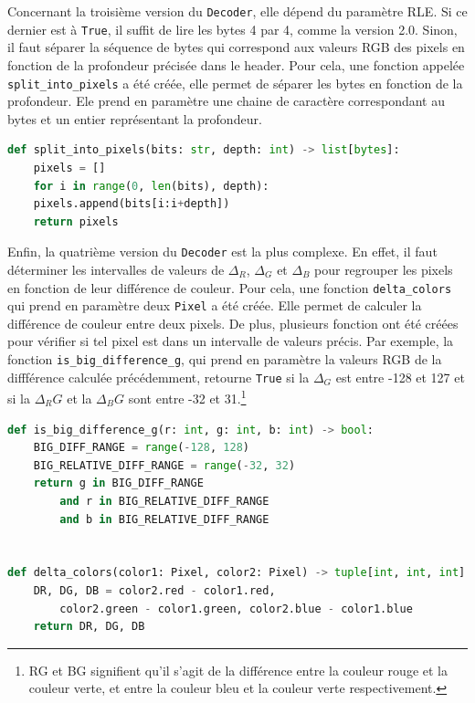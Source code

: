 \documentclass[utf8]{article}
\begin{document}
Concernant la troisième version du \texttt{Decoder}, elle dépend du paramètre RLE. Si ce dernier est à \texttt{True}, il suffit de lire les bytes 4 par 4, comme la version 2.0. Sinon, il faut séparer la séquence de bytes qui correspond aux valeurs RGB des pixels en fonction de la profondeur précisée dans le header. Pour cela, une fonction appelée \texttt{split_into_pixels} a été créée, elle permet de séparer les bytes en fonction de la profondeur. Ele prend en paramètre une chaine de caractère correspondant au bytes et un entier représentant la profondeur.

\begin{lstlisting}[language=Python, basicstyle=\small]
def split_into_pixels(bits: str, depth: int) -> list[bytes]:
    pixels = []
    for i in range(0, len(bits), depth):
	pixels.append(bits[i:i+depth])
    return pixels
\end{lstlisting}

Enfin, la quatrième version du \texttt{Decoder} est la plus complexe. En effet, il faut déterminer les intervalles de valeurs de $\Delta_R$, $\Delta_G$ et $\Delta_B$ pour regrouper les pixels en fonction de leur différence de couleur. Pour cela, une fonction \texttt{delta_colors} qui prend en paramètre deux \texttt{Pixel} a été créée. Elle permet de calculer la différence de couleur entre deux pixels. De plus, plusieurs fonction ont été créées pour vérifier si tel pixel est dans un intervalle de valeurs précis. Par exemple, la fonction \texttt{is_big_difference_g}, qui prend en paramètre la valeurs RGB de la diffférence calculée précédemment, retourne \texttt{True} si la $\Delta_G$ est entre -128 et 127 et si la $\Delta_RG$ et la $\Delta_BG$ sont entre -32 et 31.\footnote{RG et BG signifient qu'il s'agit de la différence entre la couleur rouge et la couleur verte, et entre la couleur bleu et la couleur verte respectivement.}

\begin{lstlisting}[language=Python, basicstyle=\small]
def is_big_difference_g(r: int, g: int, b: int) -> bool:
	BIG_DIFF_RANGE = range(-128, 128)
	BIG_RELATIVE_DIFF_RANGE = range(-32, 32)
	return g in BIG_DIFF_RANGE 
		and r in BIG_RELATIVE_DIFF_RANGE 
		and b in BIG_RELATIVE_DIFF_RANGE 


def delta_colors(color1: Pixel, color2: Pixel) -> tuple[int, int, int]:
	DR, DG, DB = color2.red - color1.red, 
		color2.green - color1.green, color2.blue - color1.blue
	return DR, DG, DB
\end{lstlisting}
\end{document}
